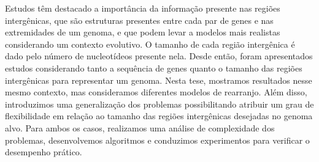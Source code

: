 \documentclass[Portugues]{ic-tese-v3}
\theoremstyle{definition}
\theoremstyle{remark}
\theoremstyle{definition}
\begin{document}
\begin{resumo}
Estudos têm destacado a importância da informação presente nas regiões intergênicas, que são estruturas presentes entre cada par de genes e nas extremidades de um genoma, e que podem levar a modelos mais realistas considerando um contexto evolutivo. O tamanho de cada região intergênica é dado pelo número de nucleotídeos presente nela. Desde então, foram apresentados estudos considerando tanto a sequência de genes quanto o tamanho das regiões intergênicas para representar um genoma. Nesta tese, mostramos resultados nesse mesmo contexto, mas consideramos diferentes modelos de rearranjo. Além disso, introduzimos uma generalização dos problemas possibilitando atribuir um grau de flexibilidade em relação ao tamanho das regiões intergênicas desejadas no genoma alvo. Para ambos os casos, realizamos uma análise de complexidade dos problemas, desenvolvemos algoritmos e conduzimos experimentos para verificar o desempenho prático. 
\end{resumo}
\end{document}
